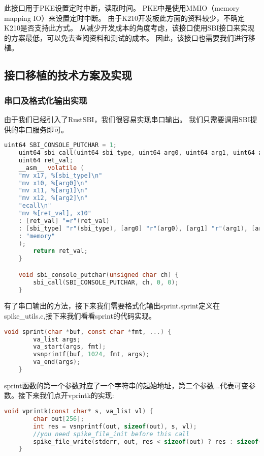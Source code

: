 此接口用于PKE设置定时中断，读取时间。
PKE中是使用MMIO（memory mapping IO）来设置定时中断。
由于K210开发板此方面的资料较少，不确定K210是否支持此方式。
从减少开发成本的角度考虑，该接口使用SBI接口来实现的方案最低，可以免去查阅资料和测试的成本。
因此，该接口也需要我们进行移植。

\subsection{接口移植的技术方案及实现}

\subsubsection{串口及格式化输出实现}

由于我们已经引入了RustSBI，我们很容易实现串口输出。
我们只需要调用SBI提供的串口服务即可。

\begin{lstlisting}[language=C, caption={串口实现代码}, label={lst:serial_output} ]
    uint64 SBI_CONSOLE_PUTCHAR = 1;
    uint64 sbi_call(uint64 sbi_type, uint64 arg0, uint64 arg1, uint64 arg2) {
    uint64 ret_val;
    __asm__ volatile (
    "mv x17, %[sbi_type]\n"
    "mv x10, %[arg0]\n"
    "mv x11, %[arg1]\n"
    "mv x12, %[arg2]\n"
    "ecall\n"
    "mv %[ret_val], x10"
    : [ret_val] "=r"(ret_val)
    : [sbi_type] "r"(sbi_type), [arg0] "r"(arg0), [arg1] "r"(arg1), [arg2] "r"(arg2)
    : "memory"
    );
        return ret_val;
    }

    void sbi_console_putchar(unsigned char ch) {
        sbi_call(SBI_CONSOLE_PUTCHAR, ch, 0, 0);
    }
\end{lstlisting}

有了串口输出的方法，接下来我们需要格式化输出sprint.sprint定义在spike\_utils.c,接下来我们看看sprint的代码实现。

\begin{lstlisting}[language=C, caption={sprint实现代码}, label={lst:sprint} ]
    void sprint(char *buf, const char *fmt, ...) {
        va_list args;
        va_start(args, fmt);
        vsnprintf(buf, 1024, fmt, args);
        va_end(args);
    }
\end{lstlisting}

sprint函数的第一个参数对应了一个字符串的起始地址，第二个参数...代表可变参数。接下来我们点开vprintk的实现:

\begin{lstlisting}[language=C, caption={vprintk实现代码}, label={lst:vprintk} ]
    void vprintk(const char* s, va_list vl) {
        char out[256];
        int res = vsnprintf(out, sizeof(out), s, vl);
        //you need spike_file_init before this call
        spike_file_write(stderr, out, res < sizeof(out) ? res : sizeof(out));
    }
\end{lstlisting}

